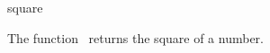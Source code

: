 \begin{ccRefFunction}{square}

\ccDefinition

The function \ccRefName\ returns the square of a number.


{}

\end{ccRefFunction}
